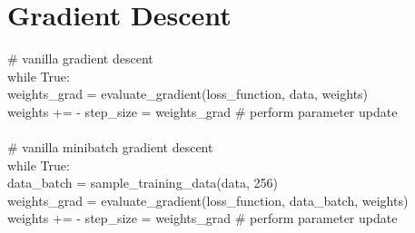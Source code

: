 \section{Gradient Descent}

\# vanilla gradient descent \\
while True: \\
	weights\_grad = evaluate\_gradient(loss\_function, data, weights) \\
	weights += - step\_size = weights\_grad # perform parameter update \\
\\
\# vanilla minibatch gradient descent \\
while True: \\
	data\_batch = sample\_training\_data(data, 256) \\
	weights\_grad = evaluate\_gradient(loss\_function, data\_batch, weights) \\
	weights += - step\_size = weights\_grad \# perform parameter update
